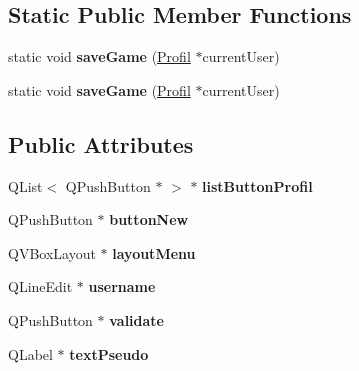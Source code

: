 \subsection*{Static Public Member Functions}
\begin{DoxyCompactItemize}
\item 
\hypertarget{class_menu_start_a7cb6adad5555d8eb90e27bed5e4333c5}{}static void {\bfseries save\+Game} (\hyperlink{class_profil}{Profil} $\ast$current\+User)\label{class_menu_start_a7cb6adad5555d8eb90e27bed5e4333c5}

\item 
\hypertarget{class_menu_start_a22fbde7b6bda9d99c6ebb430c41a49e2}{}static void {\bfseries save\+Game} (\hyperlink{class_profil}{Profil} $\ast$current\+User)\label{class_menu_start_a22fbde7b6bda9d99c6ebb430c41a49e2}

\end{DoxyCompactItemize}
\subsection*{Public Attributes}
\begin{DoxyCompactItemize}
\item 
\hypertarget{class_menu_start_adaafc9036857d8831529feb89b83990e}{}Q\+List$<$ Q\+Push\+Button $\ast$ $>$ $\ast$ {\bfseries list\+Button\+Profil}\label{class_menu_start_adaafc9036857d8831529feb89b83990e}

\item 
\hypertarget{class_menu_start_ac10532e5bfc68a845178d028d4c3a3be}{}Q\+Push\+Button $\ast$ {\bfseries button\+New}\label{class_menu_start_ac10532e5bfc68a845178d028d4c3a3be}

\item 
\hypertarget{class_menu_start_ab5759a4749f1350bee532e826b97ddf1}{}Q\+V\+Box\+Layout $\ast$ {\bfseries layout\+Menu}\label{class_menu_start_ab5759a4749f1350bee532e826b97ddf1}

\item 
\hypertarget{class_menu_start_a0d2bebeb291dcef99edef5947582c390}{}Q\+Line\+Edit $\ast$ {\bfseries username}\label{class_menu_start_a0d2bebeb291dcef99edef5947582c390}

\item 
\hypertarget{class_menu_start_a9850c71a592c3d709309befc56739d21}{}Q\+Push\+Button $\ast$ {\bfseries validate}\label{class_menu_start_a9850c71a592c3d709309befc56739d21}

\item 
\hypertarget{class_menu_start_a8a9b1af2e6c06b251dbf00f81ff4b294}{}Q\+Label $\ast$ {\bfseries text\+Pseudo}\label{class_menu_start_a8a9b1af2e6c06b251dbf00f81ff4b294}

\end{DoxyCompactItemize}


